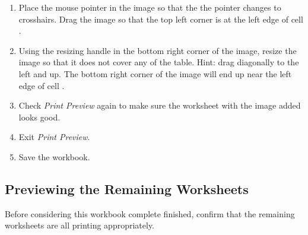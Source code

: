 \begin{enumerate}
	\item Place the mouse pointer in the image so that the the pointer changes to crosshairs. Drag the image so that the top left corner is at the left edge of cell .
	\item Using the resizing handle in the bottom right corner of the image, resize the image so that it does not cover any of the table. Hint: drag diagonally to the left and up. The bottom right corner of the image will end up near the left edge of cell .
	\item Check \textit{Print Preview} again to make sure the worksheet with the image added looks good.
	\item Exit \textit{Print Preview}. 
	\item Save the workbook.
\end{enumerate}

\subsection{Previewing the Remaining Worksheets}

Before considering this workbook complete finished, confirm that the remaining worksheets are all printing appropriately.

